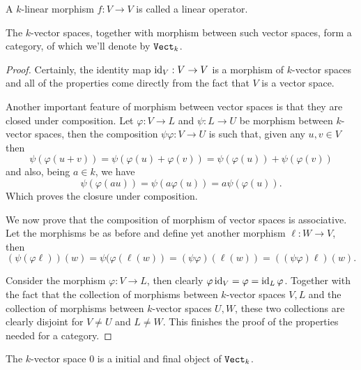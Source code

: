 \begin{definition}\label{def: linear operator}
    A \(k\)-linear morphism \(f : V \to V\) is called a linear operator.
\end{definition}

\begin{proposition}\label{prop: category of vector spaces}
    The \(k\)-vector spaces, together with morphism between such vector spaces,
    form a category, of which we'll denote by \({\texttt{Vect}}_k\).
\end{proposition}

\begin{proof}
    Certainly, the identity map \(\operatorname{id}_V : V \to V\) is a morphism of \(k\)-vector
    spaces and all of the properties come directly from the fact that \(V\) is a
    vector space.

    Another important feature of morphism between vector spaces is that they are
    closed under composition. Let \(\varphi : V \to L\) and \(\psi : L \to U\) be
    morphism between \(k\)-vector spaces, then the composition \(\psi
    \varphi : V \to U\) is such that, given any \(u, v \in V\) then
    \[
        \psi(\varphi(u+v)) = \psi(\varphi(u) + \varphi(v)) = \psi(\varphi(u)) +
        \psi(\varphi(v))
    \]
    and also, being \(a \in k\), we have
    \[
        \psi(\varphi(au)) = \psi(a\varphi(u)) = a \psi(\varphi(u)).
    \]
    Which proves the closure under composition.

    We now prove that the composition of morphism of vector spaces is
    associative. Let the morphisms be as before and define yet another morphism
    \(\ell : W \to V\), then
    \[
        (\psi  (\varphi  \ell)) (w) = \psi(\varphi(\ell(w)) = (\psi
        \varphi)(\ell(w)) = ((\psi  \varphi)  \ell) (w).
    \]

    Consider the morphism \(\varphi : V \to L\), then clearly \(\varphi
    \operatorname{id}_V = \varphi = \operatorname{id}_L  \varphi\). Together with the fact that the
    collection of morphisms between \(k\)-vector spaces \(V, L\) and the
    collection of morphisms between \(k\)-vector spaces \(U, W\), these two
    collections are clearly disjoint for \(V \neq U\) and \(L \neq W\). This
    finishes the proof of the properties needed for a category.
\end{proof}

\begin{proposition}
    The \(k \)-vector space \(0\) is a initial and final object of
    \({\texttt{Vect}}_k\).
\end{proposition}

